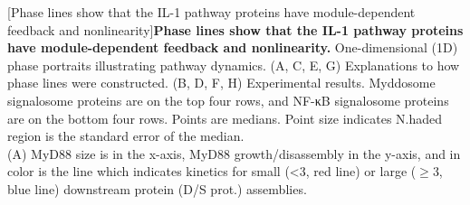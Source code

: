 \begin{centering}
\captionsetup{parbox=none}
[Phase lines show that the IL-1 pathway proteins have module-dependent feedback and nonlinearity]{\textbf{Phase lines show that the IL-1 pathway proteins have module-dependent feedback and nonlinearity.} One-dimensional (1D) phase portraits illustrating pathway dynamics. (A, C, E, G) Explanations to how phase lines were constructed. (B, D, F, H) Experimental results. Myddosome signalosome proteins are on the top four rows, and NF-κB signalosome proteins are on the bottom four rows. Points are medians. Point size indicates N.haded region is the standard error of the median.
\vspace{1em}
\\
(A) MyD88 size is in the x-axis, MyD88 growth/disassembly in the y-axis, and in color is the line which indicates kinetics for small (<3\times, red line) or large ($\geq$3\times, blue line) downstream protein (D/S prot.) assemblies.
}
\end{centering}

